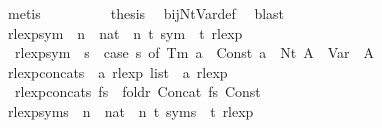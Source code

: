 \begin{isabellebody}
\ metis\isanewline
\ \ \isamarkupfalse%
\ {}\ {}\ {}\ {}\ \isamarkupfalse%
\ {\isacharquery}{\kern0pt}thesis\ \isamarkupfalse%
\ bij{\isacharunderscore}{\kern0pt}Nt{\isacharunderscore}{\kern0pt}Var{\isacharunderscore}{\kern0pt}def\ \isamarkupfalse%
\ blast\isanewline
{}\isamarkupfalse%
%
\endisatagproof
{\isafoldproof}%
%
\isadelimproof
\isanewline
%
\endisadelimproof
\isanewline
\isanewline
{}\isamarkupfalse%
\ rlexp{\isacharunderscore}{\kern0pt}sym\ {\isacharcolon}{\kern0pt}{\isacharcolon}{\kern0pt}\ {\isachardoublequoteopen}{\isacharparenleft}{\kern0pt}{\isacharprime}{\kern0pt}n\ {\isasymRightarrow}\ nat{\isacharparenright}{\kern0pt}\ {\isasymRightarrow}\ {\isacharparenleft}{\kern0pt}{\isacharprime}{\kern0pt}n{\isacharcomma}{\kern0pt}\ {\isacharprime}{\kern0pt}t{\isacharparenright}{\kern0pt}\ sym\ {\isasymRightarrow}\ {\isacharprime}{\kern0pt}t\ rlexp{\isachardoublequoteclose}\ \isanewline
\ \ {\isachardoublequoteopen}rlexp{\isacharunderscore}{\kern0pt}sym\ {\isasymgamma}{\isacharprime}{\kern0pt}\ s\ {\isacharequal}{\kern0pt}\ {\isacharparenleft}{\kern0pt}case\ s\ of\ Tm\ a\ {\isasymRightarrow}\ Const\ {\isacharbraceleft}{\kern0pt}{\isacharbrackleft}{\kern0pt}a{\isacharbrackright}{\kern0pt}{\isacharbraceright}{\kern0pt}\ {\isacharbar}{\kern0pt}\ Nt\ A\ {\isasymRightarrow}\ Var\ {\isacharparenleft}{\kern0pt}{\isasymgamma}{\isacharprime}{\kern0pt}\ A{\isacharparenright}{\kern0pt}{\isacharparenright}{\kern0pt}{\isachardoublequoteclose}\isanewline
\isanewline
{}\isamarkupfalse%
\ rlexp{\isacharunderscore}{\kern0pt}concats\ {\isacharcolon}{\kern0pt}{\isacharcolon}{\kern0pt}\ {\isachardoublequoteopen}{\isacharprime}{\kern0pt}a\ rlexp\ list\ {\isasymRightarrow}\ {\isacharprime}{\kern0pt}a\ rlexp{\isachardoublequoteclose}\ \isanewline
\ \ {\isachardoublequoteopen}rlexp{\isacharunderscore}{\kern0pt}concats\ fs\ {\isacharequal}{\kern0pt}\ foldr\ Concat\ fs\ {\isacharparenleft}{\kern0pt}Const\ {\isacharbraceleft}{\kern0pt}{\isacharbrackleft}{\kern0pt}{\isacharbrackright}{\kern0pt}{\isacharbraceright}{\kern0pt}{\isacharparenright}{\kern0pt}{\isachardoublequoteclose}\isanewline
\isanewline
{}\isamarkupfalse%
\ rlexp{\isacharunderscore}{\kern0pt}syms\ {\isacharcolon}{\kern0pt}{\isacharcolon}{\kern0pt}\ {\isachardoublequoteopen}{\isacharparenleft}{\kern0pt}{\isacharprime}{\kern0pt}n\ {\isasymRightarrow}\ nat{\isacharparenright}{\kern0pt}\ {\isasymRightarrow}\ {\isacharparenleft}{\kern0pt}{\isacharprime}{\kern0pt}n{\isacharcomma}{\kern0pt}\ {\isacharprime}{\kern0pt}t{\isacharparenright}{\kern0pt}\ syms\ {\isasymRightarrow}\ {\isacharprime}{\kern0pt}t\ rlexp{\isachardoublequoteclose}\ \isanewline

\end{isabellebody}
